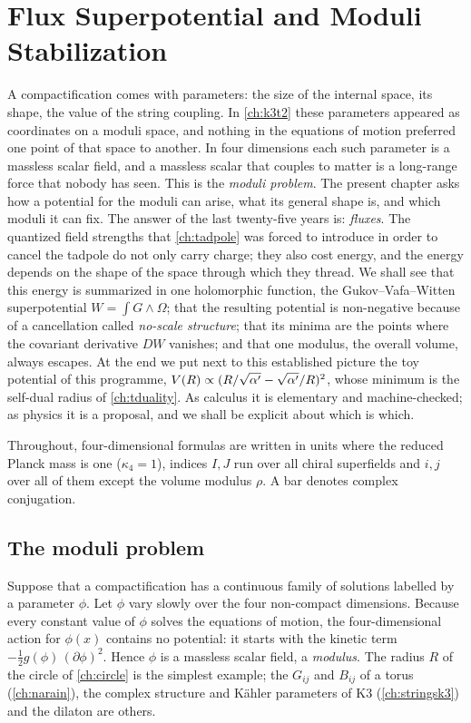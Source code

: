 \chapter{Flux Superpotential and Moduli Stabilization}\label{ch:stabilization}

A compactification comes with parameters: the size of the internal space, its shape, the
value of the string coupling. In \cref{ch:k3t2} these parameters appeared as coordinates on a
moduli space, and nothing in the equations of motion preferred one point of that space to
another. In four dimensions each such parameter is a massless scalar field, and a massless
scalar that couples to matter is a long-range force that nobody has seen. This is the
\emph{moduli problem}. The present chapter asks how a potential for the
moduli can arise, what its general shape is, and which moduli it can fix. The answer of the
last twenty-five years is: \emph{fluxes}. The quantized field strengths that \cref{ch:tadpole}
was forced to introduce in order to cancel the tadpole do not only carry charge; they also
cost energy, and the energy depends on the shape of the space through which they thread. We
shall see that this energy is summarized in one holomorphic function, the
Gukov--Vafa--Witten superpotential $W=\int G\wedge\Omega$; that the resulting potential is
non-negative because of a cancellation called \emph{no-scale structure}; that its minima are
the points where the covariant derivative $D W$ vanishes; and that one modulus, the overall
volume, always escapes. At the end we put next to this established picture the toy potential
of this programme, $V(R)\propto(R/\sqrt{\alpha'}-\sqrt{\alpha'}/R)^2$, whose minimum is the self-dual
radius of \cref{ch:tduality}. As calculus it is elementary and machine-checked; as physics it
is a proposal, and we shall be explicit about which is which.

Throughout, four-dimensional formulas are written in units where the reduced Planck mass is
one ($\kappa_4=1$), indices $I,J$ run over all chiral superfields and $i,j$ over all of them
except the volume modulus $\rho$. A bar denotes complex conjugation.

\section{The moduli problem}\label{sec:stabilization:problem}

Suppose that a compactification has a continuous family of solutions labelled by a parameter
$\phi$. Let $\phi$ vary slowly over the four non-compact dimensions. Because every constant
value of $\phi$ solves the equations of motion, the four-dimensional action for $\phi(x)$
contains no potential: it starts with the kinetic term $-\tfrac12 g(\phi)\,(\partial\phi)^2$.
Hence $\phi$ is a massless scalar field, a \emph{modulus}. The radius $R$ of
the circle of \cref{ch:circle} is the simplest example; the $G_{ij}$ and $B_{ij}$ of a torus
(\cref{ch:narain}), the complex structure and K\"ahler parameters of K3 (\cref{ch:stringsk3})
and the dilaton are others.

